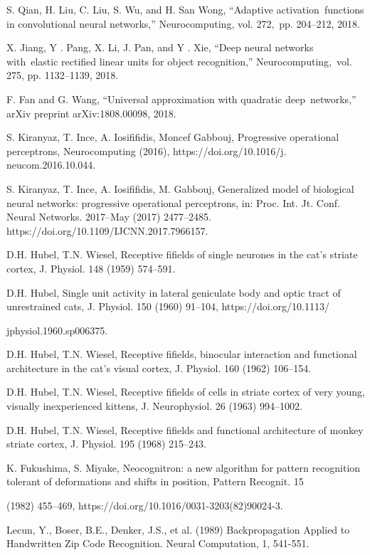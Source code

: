 \documentclass[15pt]{article}
\begin{document}
\begin{thebibliography}{99}
 S. Qian, H. Liu, C. Liu, S. Wu, and H. San Wong, “Adaptive activation functions in convolutional neural networks,” Neurocomputing, vol. 272, pp. 204–212, 2018.

 X. Jiang, Y . Pang, X. Li, J. Pan, and Y . Xie, “Deep neural networks with elastic rectified linear units for object recognition,” Neurocomputing, vol. 275, pp. 1132–1139, 2018.

 F. Fan and G. Wang, “Universal approximation with quadratic deep networks,” arXiv preprint arXiv:1808.00098, 2018.

 S. Kiranyaz, T. Ince, A. Iosififidis, Moncef Gabbouj, Progressive operational perceptrons, Neurocomputing (2016), https://doi.org/10.1016/j. neucom.2016.10.044.

 S. Kiranyaz, T. Ince, A. Iosififidis, M. Gabbouj, Generalized model of biological neural networks: progressive operational perceptrons, in: Proc. Int. Jt. Conf. Neural Networks. 2017–May (2017) 2477–2485. https://doi.org/10.1109/IJCNN.2017.7966157.

 D.H. Hubel, T.N. Wiesel, Receptive fifields of single neurones in the cat’s striate cortex, J. Physiol. 148 (1959) 574–591.

 D.H. Hubel, Single unit activity in lateral geniculate body and optic tract of unrestrained cats, J. Physiol. 150 (1960) 91–104, https://doi.org/10.1113/

jphysiol.1960.sp006375.

 D.H. Hubel, T.N. Wiesel, Receptive fifields, binocular interaction and functional architecture in the cat’s visual cortex, J. Physiol. 160 (1962) 106–154.

 D.H. Hubel, T.N. Wiesel, Receptive fifields of cells in striate cortex of very young, visually inexperienced kittens, J. Neurophysiol. 26 (1963) 994–1002.

 D.H. Hubel, T.N. Wiesel, Receptive fifields and functional architecture of monkey striate cortex, J. Physiol. 195 (1968) 215–243.

 K. Fukushima, S. Miyake, Neocognitron: a new algorithm for pattern recognition tolerant of deformations and shifts in position, Pattern Recognit. 15

(1982) 455–469, https://doi.org/10.1016/0031-3203(82)90024-3.

 Lecun, Y., Boser, B.E., Denker, J.S., et al. (1989) Backpropagation Applied to Handwritten Zip Code Recognition. Neural Computation, 1, 541-551.


\end{thebibliography}
\end{document}

